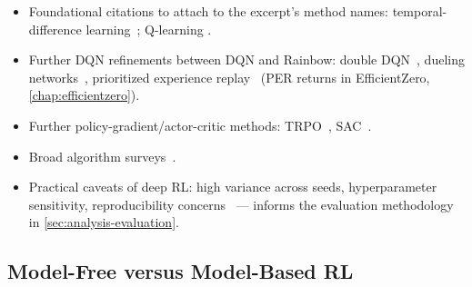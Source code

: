 \begin{itemize}
  \item Foundational citations to attach to the excerpt's method names:
    temporal-difference learning~\cite{sutton_learning_1988}; Q-learning
    .
  \item Further DQN refinements between DQN and Rainbow: double DQN~\cite{hasselt_deep_2015},
    dueling networks~\cite{wang_dueling_2016}, prioritized experience
    replay~\cite{schaul_prioritized_2016} (PER returns in EfficientZero,
    \cref{chap:efficientzero}).
  \item Further policy-gradient/actor-critic methods: TRPO~\cite{schulman_trust_2017},
    SAC~\cite{haarnoja_soft_2018}.
  \item Broad algorithm surveys~\cite{ghasemi_comprehensive_2025}.
  \item Practical caveats of deep RL: high variance across seeds, hyperparameter sensitivity,
    reproducibility concerns~\cite{henderson_deep_2019} --- informs the evaluation methodology in
    \cref{sec:analysis-evaluation}.
\end{itemize}

\subsection{Model-Free versus Model-Based RL}\label{sec:rl-model-based}

